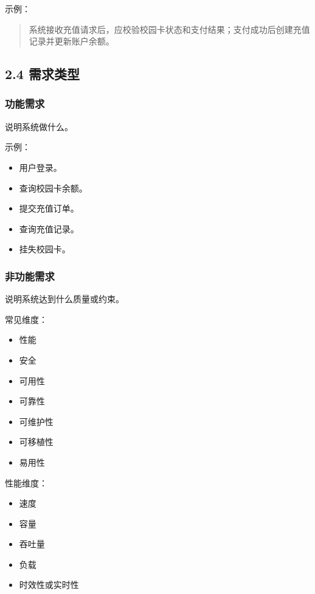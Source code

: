\documentclass[UTF8,zihao=-4]{ctexart}
\begin{document}
示例：

\begin{quote}
系统接收充值请求后，应校验校园卡状态和支付结果；支付成功后创建充值记录并更新账户余额。
\end{quote}

\subsection{2.4 需求类型}

\subsubsection{功能需求}

说明系统做什么。

示例：

\begin{itemize}
\item 用户登录。
\item 查询校园卡余额。
\item 提交充值订单。
\item 查询充值记录。
\item 挂失校园卡。
\end{itemize}

\subsubsection{非功能需求}

说明系统达到什么质量或约束。

常见维度：

\begin{itemize}
\item 性能
\item 安全
\item 可用性
\item 可靠性
\item 可维护性
\item 可移植性
\item 易用性
\end{itemize}

性能维度：

\begin{itemize}
\item 速度
\item 容量
\item 吞吐量
\item 负载
\item 时效性或实时性
\end{itemize}
\end{document}

